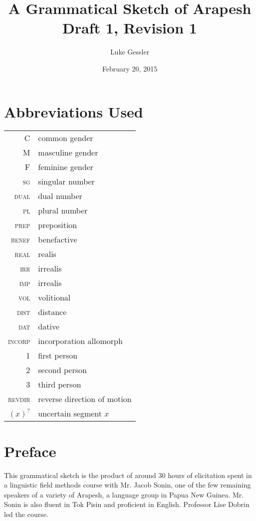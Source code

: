 \documentclass[pdftex,12pt,letterpaper]{article}
\title{A Grammatical Sketch of Arapesh \\ Draft 1, Revision 1}
\author{Luke Gessler}
\date{February 20, 2015}
\begin{document}

\tableofcontents
\listoffigures
\pagebreak
\section*{Abbreviations Used}

\begin{tabular}{rl}
\textsc{C} & common gender \\
\textsc{M} & masculine gender \\
\textsc{F} & feminine gender \\
\textsc{sg} & singular number \\
\textsc{dual} & dual number \\
\textsc{pl} & plural number \\
\textsc{prep} & preposition \\
\textsc{benef} & benefactive \\
\textsc{real} & realis \\
\textsc{irr} & irrealis \\
\textsc{imp} & irrealis \\
\textsc{vol} & volitional \\
\textsc{dist} & distance \\
\textsc{dat} & dative \\
\textsc{incorp} & incorporation allomorph \\
\textsc{1} & first person \\
\textsc{2} & second person \\
\textsc{3} & third person \\
\textsc{revdir} & reverse direction of motion \\
$(x)^?$ & uncertain segment $x$ \\

\end{tabular}
\pagebreak
\doublespacing

\section*{Preface}

This grammatical sketch is the product of around 30 hours of elicitation spent in a linguistic field methods course with Mr. Jacob Sonin, one of the few remaining speakers of a variety of Arapesh, a language group in Papua New Guinea. Mr. Sonin is also fluent in Tok Pisin and proficient in English. Professor Lise Dobrin led the course.
\end{document}
